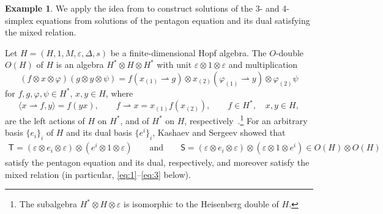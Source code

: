 \documentclass[pdftex]{sigma}
\numberwithin{equation}{section}
\theoremstyle{definition}
\newtheorem{Example}[Theorem]{Example}
\begin{document}
\begin{Example}\label{ex:tenterm from Hopf}
 We apply the idea from \cite[Section~4]{kashaev1998pentagon} to construct solutions of the 3- and 4-simplex equations from solutions of the pentagon equation and its dual satisfying the mixed relation.

 Let $H=(H,1,M,\varepsilon,\Delta,s)$ be a finite-dimensional Hopf algebra. The $O$-double $O(H)$ of $H$ is an algebra $H^*\otimes H\otimes H^*$ with unit $\varepsilon\otimes 1\otimes\varepsilon$ and multiplication
 \begin{equation*}
 (f\otimes x\otimes \varphi)(g\otimes y\otimes\psi) = f(x_{(1)}\rightharpoonup g)\otimes x_{(2)}(\varphi_{(1)}\rightharpoonup y)\otimes\varphi_{(2)}\psi
 \end{equation*}
for $f,g,\varphi,\psi\in H^*$, $x,y\in H$, where
\begin{equation*}
 \langle x\rightharpoonup f,y\rangle=f(yx),\qquad f\rightharpoonup x=x_{(1)}f(x_{(2)}),\qquad f\in H^*,\quad x,y\in H,
 \end{equation*}
 are the left actions of $H$ on $H^*$, and of $H^*$ on $H$, respectively~\cite{novikov2000various}.\footnote{The subalgebra $H^*\otimes H\otimes \varepsilon$ is isomorphic to the Heisenberg double of $H$.} For an arbitrary basis $\{e_i\}_i$ of $H$ and its dual basis $\{e^i\}_i$, Kashaev and Sergeev showed that
 \begin{gather*}
 \mathsf{T}=(\varepsilon\otimes e_i\otimes\varepsilon)\otimes(e^i\otimes 1\otimes\varepsilon)\!\qquad\text{and}\!\qquad \mathsf{S}=(\varepsilon\otimes e_i\otimes\varepsilon)\otimes(\varepsilon\otimes 1\otimes e^i)\in O(H)\otimes O(H)
 \end{gather*}
 satisfy the pentagon equation and its dual, respectively, and moreover satisfy the mixed relation (in particular, \eqref{eq:1}--\eqref{eq:3} below).


\end{Example}
\end{document}
